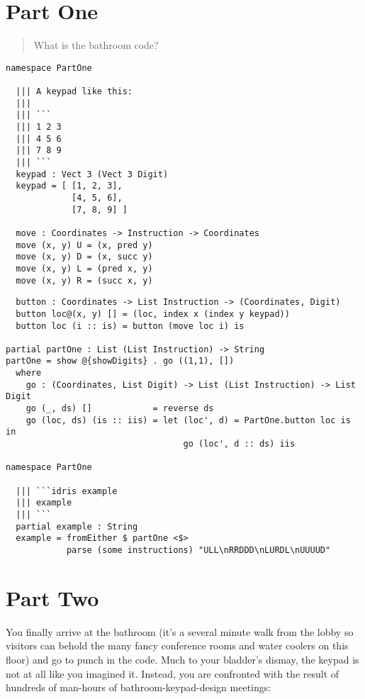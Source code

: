 \documentclass[b5paper,twoside]{amsbook}
\begin{document}
\section{Part One}\label{part-one}

\begin{quote}
  What is the bathroom code?
\end{quote}

\begin{verbatim}
namespace PartOne

  ||| A keypad like this:
  |||
  ||| ```
  ||| 1 2 3
  ||| 4 5 6
  ||| 7 8 9
  ||| ```
  keypad : Vect 3 (Vect 3 Digit)
  keypad = [ [1, 2, 3],
             [4, 5, 6],
             [7, 8, 9] ]

  move : Coordinates -> Instruction -> Coordinates
  move (x, y) U = (x, pred y)
  move (x, y) D = (x, succ y)
  move (x, y) L = (pred x, y)
  move (x, y) R = (succ x, y)
\end{verbatim}

\newpage

\begin{verbatim}
  button : Coordinates -> List Instruction -> (Coordinates, Digit)
  button loc@(x, y) [] = (loc, index x (index y keypad))
  button loc (i :: is) = button (move loc i) is

partial partOne : List (List Instruction) -> String
partOne = show @{showDigits} . go ((1,1), [])
  where
    go : (Coordinates, List Digit) -> List (List Instruction) -> List Digit
    go (_, ds) []            = reverse ds
    go (loc, ds) (is :: iis) = let (loc', d) = PartOne.button loc is in
                                   go (loc', d :: ds) iis

namespace PartOne

  ||| ```idris example
  ||| example
  ||| ```
  partial example : String
  example = fromEither $ partOne <$>
            parse (some instructions) "ULL\nRRDDD\nLURDL\nUUUUD"
\end{verbatim}

\section{Part Two}\label{part-two}

You finally arrive at the bathroom (it's a several minute walk from the
lobby so visitors can behold the many fancy conference rooms and water
coolers on this floor) and go to punch in the code. Much to your
bladder's dismay, the keypad is not at all like you imagined it.
Instead, you are confronted with the result of hundreds of man-hours of
bathroom-keypad-design meetings:
\end{document}
